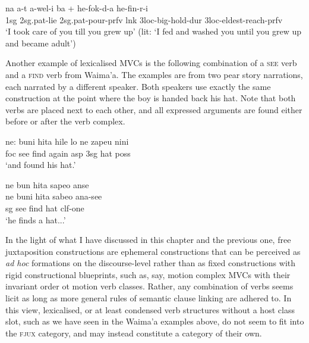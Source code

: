 \ea \label{Abui_34}
\gll na a-t a-wel-i ba + he-fok-d-a he-fin-r-i \\
1\acs{sg} 2\acs{sg}.\acs{pat}-lie 2\acs{sg}.\acs{pat}-pour-\acs{prfv} \acs{lnk} 3\acs{loc}-big-hold-\acs{dur} 3\acs{loc}-eldest-reach-\acs{prfv} \\
\glft ‘I took care of you till you grew up’ (lit: ‘I fed and washed you until you grew up and
became adult’) \\ 
\z
\xe

Another example of lexicalised MVCs is the following combination of a \textsc{see} verb and a \textsc{find} verb from Waima'a. The examples are from two pear story narrations, each narrated by a different speaker. Both speakers use exactly the same construction at the point where the boy is handed back his hat. Note that both verbs are placed next to each other, and all expressed arguments are found either before or after the verb complex.

\ea \label{}
\gll ne: buni hita hile lo ne zapeu nini \\
\acs{foc} see find again \acs{asp} 3\acs{sg} hat \acs{poss} \\
\glft `and found his hat.' \\ 
\z
\xe

\ea \label{}
\gll ne bun hita sapeo anse \\
ne buni hita sabeo ana-see \\
\acs{sg} see find hat \acs{clf}-one \\
\glft `he finds a hat...'  \\ 
\z
\xe

In the light of what I have discussed in this chapter and the previous one, free juxtaposition constructions are ephemeral constructions that can be perceived as \textit{ad hoc} formations on the discourse-level rather than as fixed constructions with rigid constructional blueprints, such as, say, motion complex MVCs with their invariant order ot motion verb classes. Rather, any combination of verbs seems licit as long as more general rules of semantic clause linking are adhered to. In this view, lexicalised, or at least condensed verb structures without a host class slot, such as we have seen in the Waima'a examples above, do not seem to fit into the \textsc{fjux} category, and may instead constitute a category of their own.

